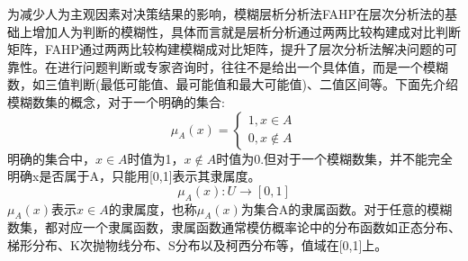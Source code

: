 为减少人为主观因素对决策结果的影响，模糊层析分析法FAHP在层次分析法的基础上增加人为判断的模糊性，具体而言就是层析分析通过两两比较构建成对比判断矩阵，FAHP通过两两比较构建模糊成对比矩阵，提升了层次分析法解决问题的可靠性。在进行问题判断或专家咨询时，往往不是给出一个具体值，而是一个模糊数，如三值判断(最低可能值、最可能值和最大可能值)、二值区间等。下面先介绍模糊数集的概念，对于一个明确的集合:
\begin{equation}
\mu_{A}(x) = \left\{\begin{array}{l}
1, x\in A \\ [0.3cm]
0, x\notin A
\end{array}\right.
\end{equation}
明确的集合中，\begin{math}x\in A\end{math}时值为1，\begin{math}x\notin A\end{math}时值为0.但对于一个模糊数集，并不能完全明确x是否属于A，只能用[0,1]表示其隶属度。
\begin{equation}
\mu_{A}(x):U\to[0,1]
\end{equation}
\begin{math}\mu_{A}(x)\end{math}表示\begin{math}x\in A\end{math}的隶属度，也称\begin{math}\mu_{A}(x)\end{math}为集合A的隶属函数。对于任意的模糊数集，都对应一个隶属函数，隶属函数通常模仿概率论中的分布函数如正态分布、梯形分布、K次抛物线分布、S分布以及柯西分布等，值域在[0,1]上。

